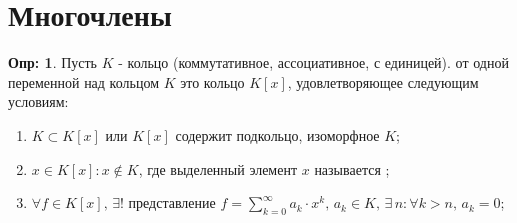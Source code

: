 \documentclass[12pt]{article}
\newcommand{\RN}[1]{%
	\textup{\uppercase\expandafter{\romannumeral#1}}%
}
\theoremstyle{definition}
\newtheorem{defn}{Опр:}
\newcommand{\ddsum}[2]{\displaystyle\sum\limits_{#1}^{#2}}
\begin{document}
\lhead{Алгебра-\RN{1}}

\section*{Многочлены}
\begin{defn}
	Пусть $K$ - кольцо (коммутативное, ассоциативное, с единицей).  от одной переменной над кольцом $K$ это кольцо $K[x]$, удовлетворяющее следующим условиям:
	\begin{enumerate}[label=\arabic*)]
		\item $K \subset K[x]$ или $K[x]$ содержит подкольцо, изоморфное $K$;
		\item $x \in K[x] \colon x \not\in K$, где выделенный элемент $x$ называется ;
		\item $\forall f \in K[x], \, \exists!$  представление $f = \ddsum{k =0 }{\infty}a_k{\cdot}x^k, \,  a_k \in K, \, \exists \, n \colon \forall k > n, \, a_k = 0$;
	\end{enumerate}
\end{defn}
\end{document}
